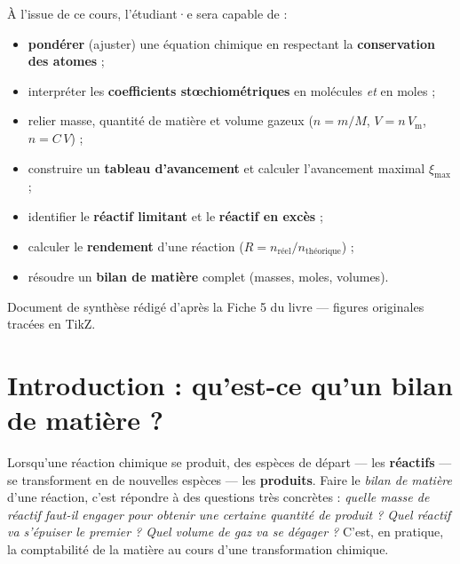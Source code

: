 \documentclass[11pt,a4paper]{article}
\newcommand{\Vm}{V_{\mathrm{m}}}          %
\begin{document}
\begin{tcolorbox}[boxbase,colback=primary!5,colframe=primary,width=15cm,
    title={\textsc{Objectifs pédagogiques de la fiche}}]
À l'issue de ce cours, l'étudiant·e sera capable de :
\begin{itemize}[leftmargin=1.6em,topsep=2pt,itemsep=1pt]
  \item \textbf{pondérer} (ajuster) une équation chimique en respectant la \textbf{conservation des atomes} ;
  \item interpréter les \textbf{coefficients stœchiométriques} en molécules \emph{et} en moles ;
  \item relier masse, quantité de matière et volume gazeux ($n=m/M$,\; $V=n\,\Vm$,\; $n=C\,V$) ;
  \item construire un \textbf{tableau d'avancement} et calculer l'avancement maximal $\xi_{\max}$ ;
  \item identifier le \textbf{réactif limitant} et le \textbf{réactif en excès} ;
  \item calculer le \textbf{rendement} d'une réaction ($R=n_{\text{réel}}/n_{\text{théorique}}$) ;
  \item résoudre un \textbf{bilan de matière} complet (masses, moles, volumes).
\end{itemize}
\end{tcolorbox}

\vspace{0.4cm}
{\small\color{black!60} Document de synthèse rédigé d'après la Fiche 5 du livre — figures originales tracées en TikZ.}
\par
\endgroup

\newpage
\renewcommand{\contentsname}{\textcolor{primarydark}{Table des matières}}
\tableofcontents
\thispagestyle{fancy}
\newpage

\section{Introduction : qu'est-ce qu'un bilan de matière ?}
Lorsqu'une réaction chimique se produit, des espèces de départ — les \textbf{réactifs} — se
transforment en de nouvelles espèces — les \textbf{produits}. Faire le \emph{bilan de matière}
d'une réaction, c'est répondre à des questions très concrètes : \emph{quelle masse de réactif
faut-il engager pour obtenir une certaine quantité de produit ? Quel réactif va s'épuiser le
premier ? Quel volume de gaz va se dégager ?} C'est, en pratique, la comptabilité de la matière
au cours d'une transformation chimique.
\end{document}
